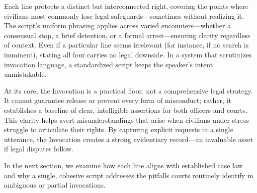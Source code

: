 Each line protects a distinct but interconnected right, covering the points where civilians most commonly lose legal safeguards—sometimes without realizing it. The script’s uniform phrasing applies across varied encounters—whether a consensual stop, a brief detention, or a formal arrest—ensuring clarity regardless of context. Even if a particular line seems irrelevant (for instance, if no search is imminent), stating all four carries no legal downside. In a system that scrutinizes invocation language, a standardized script keeps the speaker’s intent unmistakable.

At its core, the Invocation is a practical floor, not a comprehensive legal strategy. It cannot guarantee release or prevent every form of misconduct; rather, it establishes a baseline of clear, intelligible assertions for both officers and courts. This clarity helps avert misunderstandings that arise when civilians under stress struggle to articulate their rights. By capturing explicit requests in a single utterance, the Invocation creates a strong evidentiary record—an invaluable asset if legal disputes follow.

In the next section, we examine how each line aligns with established case law and why a single, cohesive script addresses the pitfalls courts routinely identify in ambiguous or partial invocations.
